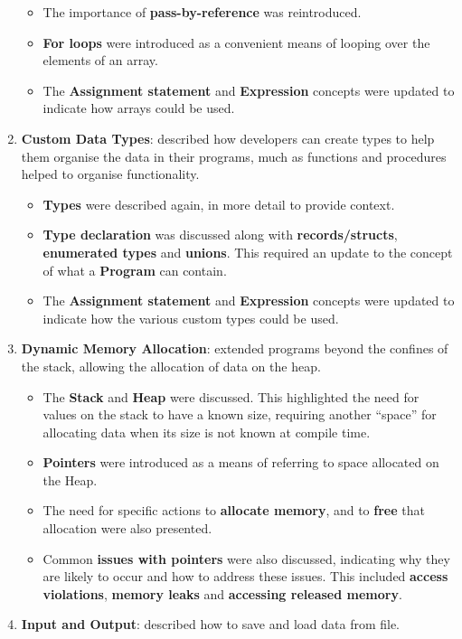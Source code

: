 \begin{enumerate}
\begin{itemize}[noitemsep,nolistsep]
    \item The importance of \textbf{pass-by-reference} was reintroduced.
    \item \textbf{For loops} were introduced as a convenient means of looping over the elements of an array. 
    \item The \textbf{Assignment statement} and \textbf{Expression} concepts were updated to indicate how arrays could be used.
  \end{itemize}
  \item \textbf{Custom Data Types}: described how developers can create types to help them organise the data in their programs, much as functions and procedures helped to organise functionality.
  \begin{itemize}[noitemsep,nolistsep]
    \item \textbf{Types} were described again, in more detail to provide context. 
    \item \textbf{Type declaration} was discussed along with \textbf{records/structs}, \textbf{enumerated types} and \textbf{unions}. This required an update to the concept of what a \textbf{Program} can contain.
    \item The \textbf{Assignment statement} and \textbf{Expression} concepts were updated to indicate how the various custom types could be used.
  \end{itemize}
  \item \textbf{Dynamic Memory Allocation}: extended programs beyond the confines of the stack, allowing the allocation of data on the heap.
  \begin{itemize}[noitemsep,nolistsep]
    \item The \textbf{Stack} and \textbf{Heap} were discussed. This highlighted the need for values on the stack to have a known size, requiring another ``space'' for allocating data when its size is not known at compile time.
    \item \textbf{Pointers} were introduced as a means of referring to space allocated on the Heap.
    \item The need for specific actions to \textbf{allocate memory}, and to \textbf{free} that allocation were also presented.
    \item Common \textbf{issues with pointers} were also discussed, indicating why they are likely to occur and how to address these issues. This included \textbf{access violations}, \textbf{memory leaks} and \textbf{accessing released memory}. 
  \end{itemize}
  \item \textbf{Input and Output}: described how to save and load data from file.

\end{enumerate}
